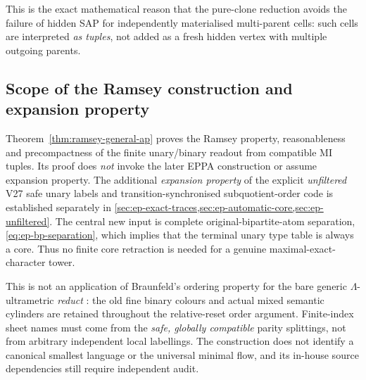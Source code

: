 This is the exact mathematical reason that the pure-clone reduction
avoids the failure of hidden SAP for independently materialised
multi-parent cells: such cells are interpreted \emph{as tuples},
not added as a fresh hidden vertex with multiple outgoing parents.

\subsection{Scope of the Ramsey construction and expansion property}
Theorem~\ref{thm:ramsey-general-ap} proves the Ramsey property,
reasonableness and precompactness of the finite unary/binary
readout from compatible MI tuples. Its proof does \emph{not}
invoke the later EPPA construction or assume expansion property.
The additional \emph{expansion property} of the explicit
\emph{unfiltered} V27 safe unary labels and transition-synchronised
subquotient-order code is established separately in
\cref{sec:ep-exact-traces,sec:ep-automatic-core,sec:ep-unfiltered}.
The central new input is complete original-bipartite-atom
separation, \eqref{eq:ep-bp-separation}, which implies that the
terminal unary type table is always a core. Thus no finite
core retraction is needed for a genuine maximal-exact-character
tower.

This is not an application of Braunfeld's ordering property
for the bare generic $\Lambda$-ultrametric \emph{reduct}
\cite{Braunfeld}: the old fine binary colours and actual mixed
semantic cylinders are retained throughout the relative-reset
order argument. Finite-index sheet names must come from the
\emph{safe, globally compatible} parity splittings, not from
arbitrary independent local labellings. The construction does
not identify a canonical smallest language or the universal
minimal flow, and its in-house source dependencies still
require independent audit.
